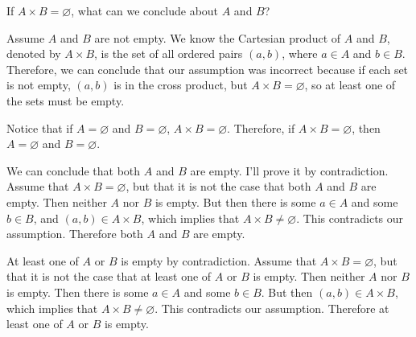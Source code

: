 \begin{eval}
If $A\times B=\varnothing$, what can we conclude about $A$ and $B$?
\begin{ssolenum}
\item
Assume $A$ and $B$ are not empty. We know the Cartesian product of $A$ and $B$, denoted by $A\times B$, 
is the set of all ordered pairs $(a,b)$, where $a\in A$ and $b\in B$.  Therefore, we can conclude that our
assumption was incorrect because if each set is not empty, $(a,b)$ is in the cross product, but 
$A\times B=\varnothing$, so at least one of the sets must be empty.

\noindent
\evallinetwo
\item
Notice that if $A=\varnothing$ and $B=\varnothing$, $A\times B = \varnothing$.
Therefore, if $A\times B = \varnothing$, then $A=\varnothing$ and $B=\varnothing$.

\noindent
\evallinetwo
\item
We can conclude that both $A$ and $B$ are empty.  I'll prove it by contradiction.
Assume that $A\times B=\varnothing$, but that it is not the case that both $A$ and $B$ are empty. 
Then neither $A$ nor $B$  is empty. 
But then there is some $a\in A$ and some $b\in B$, and $(a,b)\in A\times B$, which 
implies that $A\times B\neq\varnothing$.  This contradicts our assumption.  Therefore
both $A$ and $B$ are empty.

\noindent
\evallinetwo
\item
At least one of $A$ or $B$ is empty by contradiction.
Assume that $A\times B=\varnothing$, but that it is not the case that at least one of $A$ or $B$ is empty.  
Then neither $A$ nor $B$ is empty.
Then there is some $a\in A$ and some $b\in B$.  But then $(a,b)\in A\times B$, which 
implies that $A\times B\neq\varnothing$.  This contradicts our assumption.  Therefore
at least one of $A$ or $B$ is empty.


\end{ssolenum}
\end{eval}
